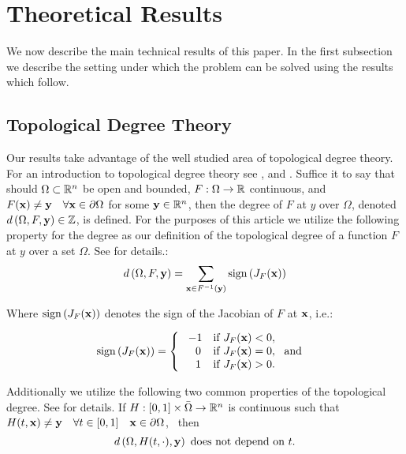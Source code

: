 \section{Theoretical Results} \label{sec:theory}  
We now describe the main technical results of this paper. 
In the first subsection we describe the setting under which the problem can be solved using the results which follow. 
\subsection{Topological Degree Theory}
Our results take advantage of the well studied area of topological degree theory. 
For an introduction to topological degree theory see \cite{OrChCh2006}, \cite{fonseca1995degree} and \cite{MoVrYa2002}. 
Suffice it to say that should $\Omega\subset\mathbb{R}^{n}$ be open and bounded, $F:\Omega\rightarrow \mathbb{R}$ continuous, and $F(\mathbf{x}) \neq \mathbf{y} \quad \forall \mathbf{x}\in\partial\Omega$ for some $\mathbf{y}\in\mathbb{R}^n$, then the degree of $F$ at $y$ over $\Omega$, denoted $d\left(\Omega,F,\mathbf{y}\right)\in\mathbb{Z}$, is defined. 
For the purposes of this article we utilize the following property for the degree as our definition of the topological degree of a function $F$ at $y$ over a set $\Omega$. 
See \cite{OrChCh2006} for details.:
\begin{equation}\label{eq:Deg3}
d\left(\Omega,F,\mathbf{y}\right)=\sum\limits_{\mathbf{x}\in F^{-1}(\mathbf{y})}\operatorname{sign}\left(J_F(\mathbf{x})\right)
\end{equation}

Where $\operatorname{sign}\left(J_F(\mathbf{x})\right)$ denotes the sign of the Jacobian of $F$ at $\mathbf{x}$, i.e.:

\[\operatorname{sign}\left(J_F(\mathbf{x})\right)=   \left\{
\begin{array}{ll}
       \ -1   & \mbox{if } J_F(\mathbf{x})< 0, \\
      \quad 0 & \mbox{if } J_F(\mathbf{x})= 0,~\mbox{ and } \\
      \quad 1 & \mbox{if } J_F(\mathbf{x})> 0. \\
\end{array} 
\right. \]

Additionally we utilize the following two common properties of the topological degree. 
See \cite{OrChCh2006} for details. 
If $H : [0,1]\times\bar{\Omega}\rightarrow\mathbb{R}^n$ is continuous such that $H(t,\mathbf{x})\neq \mathbf{y} \quad \forall t\in[0,1]\quad \mathbf{x}\in\partial\Omega$,   \ then 
\begin{equation}\label{eq:Deg1} 
d\left(\Omega,H(t,\cdot),\mathbf{y}\right)\text{ does not depend on }t.
\end{equation}

